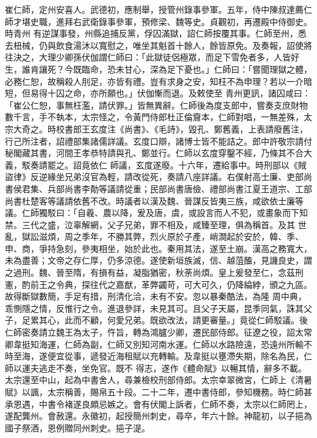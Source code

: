 \begin{pinyinscope}
 崔仁師，定州安喜人。武德初，應制舉，授管州錄事參軍。五年，侍中陳叔達薦仁師才堪史職，進拜右武衛錄事參軍，預修梁、魏等史。貞觀初，再遷殿中侍御史。時青州
 有逆謀事發，州縣追捕反黨，俘囚滿獄，詔仁師按覆其事。仁師至州，悉去杻械，仍與飲食湯沐以寬慰之，唯坐其魁首十餘人，餘皆原免。及奏報，詔使將往決之，大理少卿孫伏伽謂仁師曰：「此獄徒侶極眾，而足下雪免者多，人皆好生，誰肯讓死？今既臨命，恐未甘心，深為足下憂也。」仁師曰：「嘗聞理獄之體，必務仁恕，故稱殺人刖足，亦皆有禮。豈有求身之安，知枉不為申理？若以一介暗短，但易得十囚之命，亦所願也。」伏伽慚而退。及敕使至
 青州更訊，諸囚咸曰：「崔公仁恕，事無枉濫，請伏罪。」皆無異辭。仁師後為度支郎中，嘗奏支庶財物數千言，手不執本，太宗怪之，令黃門侍郎杜正倫齎本，仁師對唱，一無差殊，太宗大奇之。時校書郎王玄度注《尚書》、《毛詩》，毀孔、鄭舊義，上表請廢舊注，行己所注者，詔禮部集諸儒詳議。玄度口辯，諸博士皆不能詰之。郎中許敬宗請付秘閣藏其書，河間王孝恭特請與孔、鄭並行。仁師以玄度穿鑿不經，乃條其不合大義，駁奏請罷之。詔竟依仁
 師議，玄度遂廢。十六年，遷給事中。時刑部以《賊盜律》反逆緣坐兄弟沒官為輕，請改從死，奏請八座詳議。右僕射高士廉、吏部尚書侯君集、兵部尚書李勣等議請從重；民部尚書唐儉、禮部尚書江夏王道宗、工部尚書杜楚客等議請依舊不改。時議者以漢及魏、晉謀反皆夷三族，咸欲依士廉等議。仁師獨駁曰：「自羲、農以降，爰及唐，虞，或設言而人不犯，或畫象而下知禁。三代之盛，泣辜解網，父子兄弟，罪不相及，咸臻至理，俱為稱首。及其
 世亂，獄訟滋煩，周之季年，不勝其弊，烈火原於子產，峭澗起於安於，韓、季、申、商，爭持急刻，參夷相坐，始於此也。秦用其法，遂至土崩。漢高之務寬大，未為盡善；文帝之存仁厚，仍多涼德。遂使新垣族滅，信、越菹醢，見譏良史，謂之過刑。魏、晉至隋，有損有益，凝脂猶密，秋荼尚煩。皇上爰發至仁，念茲刑憲，酌前王之令典，探往代之嘉猷，革弊蠲苛，可大可久，仍降綸綍，頒之九區。故得斷獄數簡，手足有措，刑清化洽，未有不安。忽以暴秦酷法，為隆
 周中典，乖惻隱之情，反惟行之令。進退參詳，未見其可。且父子天屬，昆季同氣，誅其父子，足累其心，此而不顧，何愛兄弟。既欲改法，請更審量。」竟從仁師駁議。後仁師密奏請立魏王為太子，忤旨，轉為鴻臚少卿，遷民部侍郎。征遼之役，詔太常卿韋挺知海運，仁師為副，仁師又別知河南水運。仁師以水路險遠，恐遠州所輸不時至海，遂便宜從事，遞發近海租賦以充轉輸。及韋挺以壅滯失期，除名為民，仁師以運夫逃走不奏，坐免官。既不
 得志，遂作《體命賦》以暢其情，辭多不載。太宗還至中山，起為中書舍人，尋兼檢校刑部侍郎。太宗幸翠微宮，仁師上《清暑賦》以諷，太宗稱善，賜帛五十段。二十二年，遷中書侍郎，參知機務。時仁師甚承恩遇，中書令褚遂良頗忌嫉之。會有伏閣上訴者，仁師不奏，太宗以仁師罔上，遂配龔州。會赦還。永徽初，起授簡州刺史，尋卒，年六十餘。神龍初，以子挹為國子祭酒，恩例贈同州刺史。挹子湜。




\end{pinyinscope}

